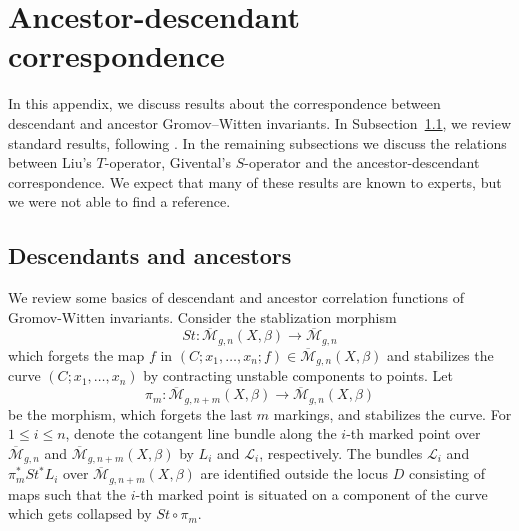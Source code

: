 \documentclass[12pt,reqno]{amsart}
\theoremstyle{plain}
\theoremstyle{definition}
\theoremstyle{remark}
\begin{document}
\begin{appendix}\label{append}
\section{Ancestor-descendant correspondence}
  
In this appendix, we discuss results about the correspondence between descendant and ancestor Gromov--Witten invariants.
In Subsection~\ref{app:review}, we review standard results, following \cite[Appendix 2]{coates2007quantum}.
In the remaining subsections we discuss the relations between Liu's $T$-operator, Givental's $S$-operator and the ancestor-descendant correspondence.
We expect that many of these results are known to experts, but we were not able to find a reference.

\subsection{Descendants and ancestors}
\label{app:review}

We review some basics of descendant and ancestor correlation functions of Gromov-Witten invariants. 
Consider the stablization morphism
\[St\colon \overline{\mathcal{M}}_{g,n}(X,\beta)\rightarrow \overline{\mathcal{M}}_{g,n}\]
which forgets the map $f$ in $(C; x_1,\dots,x_n; f ) \in  \overline{\mathcal{M}}_{g,n}(X,\beta)$ and stabilizes the curve
$(C; x_1,\dots,x_n)$
by contracting unstable components to points. 
Let
\[\pi_m\colon \overline{\mathcal{M}}_{g,n+m}(X,\beta)\rightarrow \overline{\mathcal{M}}_{g,n}(X,\beta)\]
be the morphism, which forgets the last $m$ markings, and stabilizes the curve.
For $1\leq i\leq n$, denote the  cotangent line bundle  along the $i$-th marked point over $\overline{\mathcal{M}}_{g,n}$ and $\overline{\mathcal{M}}_{g,n+m}(X,\beta)$ by $L_i$ and $\mathcal{L}_i$, respectively.
The bundles $\mathcal{L}_i$ and $\pi_m^* St^*L_i$  over
$\overline{\mathcal{M}}_{g,n+m}(X,\beta)$ are identified outside the locus $D$ consisting of maps such that the $i$-th marked
point is situated on a component of the curve which gets collapsed by $St \circ \pi_m$.


\end{appendix}
\end{document}
